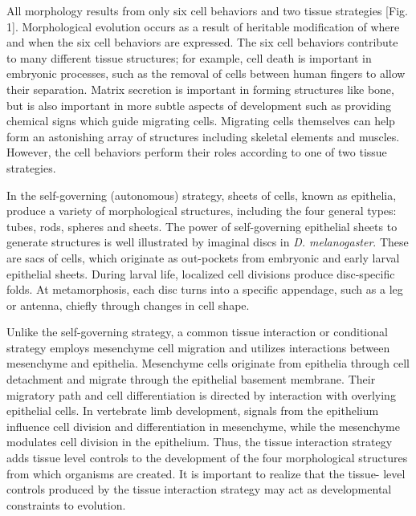 \begin{longquote}
All morphology results from only
six cell behaviors and two tissue
strategies [Fig. 1]. Morphological
evolution occurs as a result of heritable modification of where and
when the six cell behaviors are
expressed. The six cell behaviors
contribute to many different tissue
structures; for example, cell death
is important in embryonic processes, such as the removal of cells
between human fingers to allow
their separation. Matrix secretion
is important in forming structures
like bone, but is also important in
more subtle aspects of development such as providing chemical
signs which guide migrating cells.
Migrating cells themselves can
help form an astonishing array of
structures including skeletal elements and muscles. However,
the cell behaviors perform their
roles according to one of two tissue
strategies.

In the self-governing (autonomous) strategy, sheets of cells,
known as epithelia, produce a variety of morphological structures,
including the four general types:
tubes, rods, spheres and sheets.
The power of self-governing
epithelial sheets to generate structures is well illustrated by imaginal
discs in \textit{D. melanogaster}. These are
sacs of cells, which originate as out-pockets from embryonic and early
larval epithelial sheets. During
larval life, localized cell divisions
produce disc-specific folds. At
metamorphosis, each disc turns
into a specific appendage, such as
a leg or antenna, chiefly through
changes in cell shape.

Unlike the self-governing strategy, a common tissue interaction or
conditional strategy employs mesenchyme cell migration and utilizes
interactions between mesenchyme
and epithelia. Mesenchyme cells
originate from epithelia through
cell detachment and migrate
through the epithelial basement
membrane. Their migratory path
and cell differentiation is directed
by interaction with overlying
epithelial cells. In vertebrate limb
development, signals from the
epithelium influence cell division
and differentiation in mesenchyme, while the mesenchyme
modulates cell division in the
epithelium. Thus, the tissue interaction strategy adds tissue level
controls to the development of the
four morphological structures from
which organisms are created. It is
important to realize that the tissue-
level controls produced by the
tissue interaction strategy may act
as developmental constraints to
evolution.
\cite{Larsen1992}
\end{longquote}

